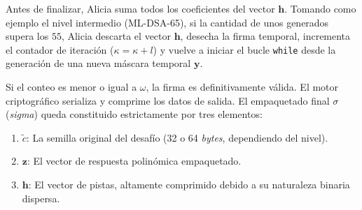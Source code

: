 \documentclass[11pt, a4paper]{report}
\theoremstyle{definition}
\begin{document}
Antes de finalizar, Alicia suma todos los coeficientes del vector $\mathbf{h}$. Tomando como ejemplo el nivel intermedio (ML-DSA-65), si la cantidad de unos generados supera los $55$, Alicia descarta el vector $\mathbf{h}$, desecha la firma temporal, incrementa el contador de iteración ($\kappa = \kappa + l$) y vuelve a iniciar el bucle \texttt{while} desde la generación de una nueva máscara temporal $\mathbf{y}$.

Si el conteo es menor o igual a $\omega$, la firma es definitivamente válida. El motor criptográfico serializa y comprime los datos de salida. El empaquetado final $\sigma$ (\textit{sigma}) queda constituido estrictamente por tres elementos:
\begin{enumerate}
    \item $\tilde{c}$: La semilla original del desafío (32 o 64 \textit{bytes}, dependiendo del nivel).
    \item $\mathbf{z}$: El vector de respuesta polinómica empaquetado.
    \item $\mathbf{h}$: El vector de pistas, altamente comprimido debido a su naturaleza binaria dispersa.
\end{enumerate}
\end{document}
